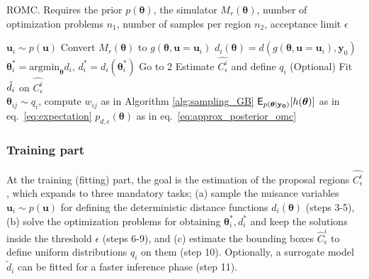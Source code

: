 \documentclass[article, shortnames]{jss}
\newcommand{\ub}{\mathbf{u}}
\newcommand{\yb}{\mathbf{y}}
\newcommand{\thetab}{\boldsymbol{\theta}}
\newcommand{\data}{\mathbf{y_0}}
\newcommand{\accregioni}{C^i_{\epsilon}}
\newcommand{\accregionihat}{\hat{C}^i_{\epsilon}}
\begin{document}
\begin{algorithm}[!ht]
  \caption{ROMC. Requires the prior \( p(\thetab) \), the simulator
    \(M_r(\thetab)\), number of optimization problems \(n_1\), number
    of samples per region \(n_2\), acceptance limit
    \(\epsilon\)}\label{alg:romc_algorithm}
  \begin{algorithmic}[1]
    \State \(\ub_i \sim p(\ub)\) 
    \State Convert \(M_r(\thetab) \) to \( g(\thetab, \ub=\ub_i) \) 
      \State \( d_i(\thetab) = d(g(\thetab, \ub=\ub_i), \yb_0) \) 
      \State \(\thetab_i^* = \text{argmin}_{\thetab} d_i\), \(d_i^*=d_i(\thetab_i^*)\) 
        \State Go to 2 
      \EndIf
      \State Estimate \(\hat{\accregioni}\) and define \(q_i\) 
      \State (Optional) Fit \(\Tilde{d}_i\) on \(\hat{\accregioni}\) 
      \\\hrulefill
      \State \(\thetab_{ij} \sim q_i\), compute \(w_{ij}\) as in Algorithm \ref{alg:sampling_GB} 
      \EndFor
    \EndFor
    \State \(\E_{p(\thetab|\data)}[h(\thetab)]\) as in eq.~\eqref{eq:expectation} 
    \State \(p_{d,\epsilon}(\thetab) \) as in eq.~\eqref{eq:approx_posterior_omc} 
    \EndProcedure
  \end{algorithmic}
\end{algorithm}

\subsubsection*{Training part}
\noindent
At the training (fitting) part, the goal is the estimation of the
proposal regions \(\hat{\accregioni}\), which expands to three
mandatory tasks; (a) sample the nuisance variables
\(\ub_i \sim p(\ub)\) for defining the deterministic distance
functions \(d_i(\thetab)\) (steps 3-5), (b) solve the optimization
problems for obtaining \(\thetab_i^*, d_i^*\) and keep the solutions
inside the threshold \(\epsilon\) (steps 6-9), and (c) estimate the
bounding boxes \(\accregionihat\) to define uniform distributions
\(q_i\) on them (step 10). Optionally, a surrogate model
\(\tilde{d}_i\) can be fitted for a faster inference phase (step 11).
\end{document}
